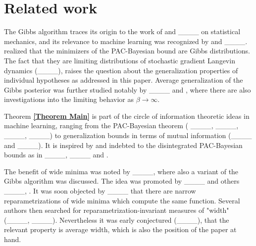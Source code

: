 \section{Related work\label{Section related work}
}

The Gibbs algorithm traces its origin to the work of \cite%
{boltzmann1877beziehung} and ____ on statistical
mechanics, and its relevance to machine learning was recognized by \cite%
{levin1990statistical} and ____. \cite%
{mcallester1999pac} realized that the minimizers of the PAC-Bayesian bound
are Gibbs distributions. The fact that they are limiting distributions of
stochastic gradient Langevin dynamics (____), raises the
question about the generalization properties of individual hypotheses as
addressed in this paper. Average generalization of the Gibbs posterior was
further studied notably by ____ and \cite%
{aminian2023information}, where there are also investigations into the
limiting behavior as $\beta \rightarrow \infty $.

Theorem \textbf{\ref{Theorem Main}} is part of the circle of information
theoretic ideas in machine learning, ranging from the PAC-Bayesian theorem (%
____, ____, ____, 
____) to generalization bounds in terms of mutual
information (____ and ____). It
is inspired by and indebted to the disintegrated PAC-Bayesian bounds as in 
____, ____ and \cite%
{viallard2024general}.

The benefit of wide minima was noted by ____, where
also a variant of the Gibbs algorithm was discussed. The idea was promoted
by ____ and others ____, \cite%
{iyer2023wide}. It was soon objected by ____ that there are
narrow reparametrizations of wide minima which compute the same function.
Several authors then searched for reparametrization-invariant measures of
"width" (____, ____).
Nevertheless it was early conjectured (____), that
the relevant property is average width, which is also the position of the
paper at hand.